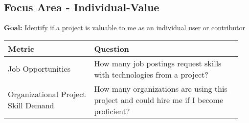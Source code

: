 
\subsection{Focus Area - Individual-Value}
\textbf{Goal:} Identify if a project is valuable to me as an individual user or contributor
\begin{table}[ht!]
    \centering
    \begin{tabular}{|p{0.35\linewidth} | p{0.6\linewidth}|}
        \hline
        \hfil \textbf{Metric}  & \hfil \textbf{Question} \\
        \hline
		Job Opportunities & How many job postings request skills with technologies from a project? \\ 
		\hline
		Organizational Project Skill Demand & How many organizations are using this project and could hire me if I become proficient? \\ 
		\hline
    \end{tabular}
\end{table}

 
 
